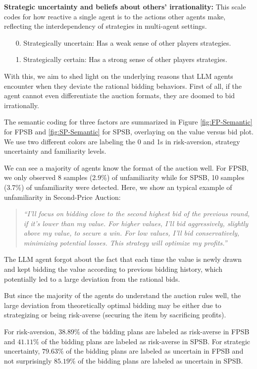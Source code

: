 \documentclass{article} %
\begin{document}
\textbf{Strategic uncertainty and beliefs about others' irrationality:} This scale codes for how reactive a single agent is to the actions other agents make, reflecting the interdependency of strategies in multi-agent settings.

\begin{enumerate}
    \item[0.] Strategically uncertain: Has a weak sense of other players strategies.
    \item[1.] Strategically certain: Has a strong sense of other players strategies.
\end{enumerate}


With this, we aim to shed light on the underlying reasons that LLM agents encounter when they deviate the rational bidding behaviors.
First of all, if the agent cannot even differentiate the auction formats, they are doomed to bid irrationally. 

The semantic coding for three factors are summarized in Figure \ref{fig:FP-Semantic} for FPSB and \ref{fig:SP-Semantic} for SPSB, overlaying on the value versus bid plot. 
We use two different colors are labeling the 0 and 1s in risk-aversion, strategy uncertainty and familiarity levels.

We can see a majority of agents know the format of the auction well. 
For FPSB, we only observed 8 samples (2.9\%) of unfamiliarity while for SPSB, 10 samples (3.7\%) of unfamiliarity were detected. 
Here, we show an typical example of unfamiliarity in Second-Price Auction:
\begin{quote}
    \textit{``I'll focus on bidding close to the second highest bid of the previous round, if it's lower than my value. For higher values, I'll bid aggressively, slightly above my value, to secure a win. For low values, I'll bid conservatively, minimizing potential losses. This strategy will optimize my profits.''}
\end{quote}
The LLM agent forgot about the fact that each time the value is newly drawn and kept bidding the value according to previous bidding history, which potentially led to a large deviation from the rational bids.

But since the majority of the agents do understand the auction rules well, the large deviation from theoretically optimal bidding may be either due to strategizing or being risk-averse (securing the item by sacrificing profits). 

For risk-aversion, $38.89\%$ of the bidding plans are labeled as risk-averse in FPSB and $41.11\%$ of the bidding plans are labeled as risk-averse in SPSB.
For strategic uncertainty, $79.63\%$ of the bidding plans are labeled as uncertain in FPSB and not surprisingly $85.19\%$ of the bidding plans are labeled as uncertain in SPSB.
\end{document}
